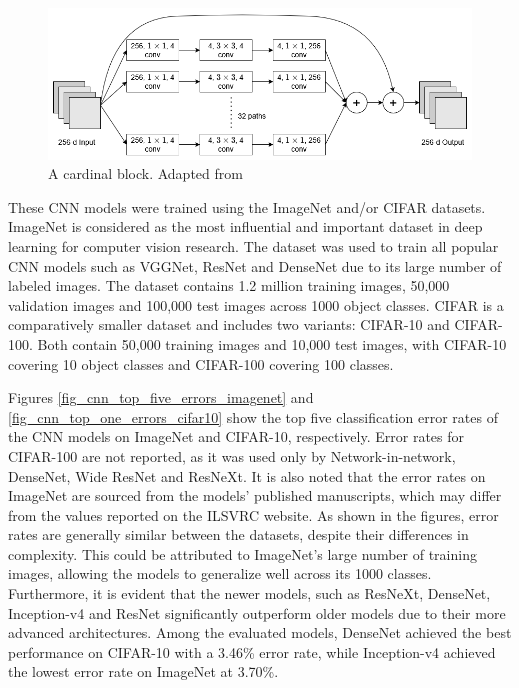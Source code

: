 \documentclass[preprint,12pt]{elsarticle}
\begin{document}
\begin{figure}[h!]
    \centering
    \includegraphics[scale=0.45]{fig_deep_sv_learning_cnn_resnext.png}
    \caption{A cardinal block. Adapted from \citep{xie_aggregated_2017}}
    \label{fig_deep_sv_learning_cnn_resnext}
\end{figure}

These CNN models were trained using the ImageNet \citep{noauthor_imagenet_nodate}  and/or CIFAR \citep{noauthor_cifar-10_nodate} datasets. ImageNet is considered as the most influential and important dataset in deep learning for computer vision research. The dataset was used to train all popular CNN models such as VGGNet, ResNet and DenseNet due to its large number of labeled images. The dataset contains 1.2 million training images, 50,000 validation images and 100,000 test images across 1000 object classes. CIFAR is a comparatively smaller dataset and includes two variants: CIFAR-10 and CIFAR-100. Both contain 50,000 training images and 10,000 test images, with CIFAR-10 covering 10 object classes and CIFAR-100 covering 100 classes.

Figures \ref{fig_cnn_top_five_errors_imagenet} and \ref{fig_cnn_top_one_errors_cifar10} show the top five classification error rates of the CNN models on ImageNet and CIFAR-10, respectively. Error rates for CIFAR-100 are not reported, as it was used only by Network-in-network, DenseNet, Wide ResNet and ResNeXt. It is also noted that the error rates on ImageNet are sourced from the models' published manuscripts, which may differ from the values reported on the ILSVRC website. As shown in the figures, error rates are generally similar between the datasets, despite their differences in complexity. This could be attributed to ImageNet's large number of training images, allowing the models to generalize well across its 1000 classes. Furthermore, it is evident that the newer models, such as ResNeXt, DenseNet, Inception-v4 and ResNet significantly outperform older models due to their more advanced architectures. Among the evaluated models, DenseNet achieved the best performance on CIFAR-10 with a 3.46\% error rate, while Inception-v4 achieved the lowest error rate on ImageNet at 3.70\%.
\end{document}
